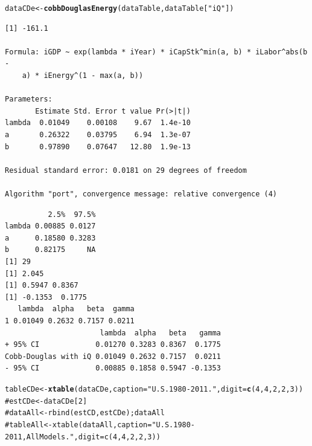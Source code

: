 \documentclass[preprint,authoryear,12pt]{elsarticle}\usepackage{graphicx, color}
\makeatletter
\newcommand{\hlfunctioncall}[1]{\textcolor[rgb]{0.501960784313725,0,0.329411764705882}{\textbf{#1}}}%
\newcommand{\hlstring}[1]{\textcolor[rgb]{0.6,0.6,1}{#1}}%
\newcommand{\hlcomment}[1]{\textcolor[rgb]{0.180392156862745,0.6,0.341176470588235}{#1}}%
\newenvironment{kframe}{%
 \def\at@end@of@kframe{}%
 \ifinner\ifhmode%
  \def\at@end@of@kframe{\end{minipage}}%
  \begin{minipage}{\columnwidth}%
 \fi\fi%
 \def\FrameCommand##1{\hskip\@totalleftmargin \hskip-\fboxsep
 \colorbox{shadecolor}{##1}\hskip-\fboxsep
     \hskip-\linewidth \hskip-\@totalleftmargin \hskip\columnwidth}%
 \MakeFramed {\advance\hsize-\width
   \@totalleftmargin\z@ \linewidth\hsize
   \@setminipage}}%
 {\par\unskip\endMakeFramed%
 \at@end@of@kframe}
\newenvironment{knitrout}{}{} %
\makeatother
\begin{document}
\begin{knitrout}
\color{fgcolor}\begin{kframe}
\begin{alltt}
dataCDe <- \hlfunctioncall{cobbDouglasEnergy}(dataTable, dataTable[\hlstring{"iQ"}])
\end{alltt}
\begin{verbatim}
[1] -161.1

Formula: iGDP ~ exp(lambda * iYear) * iCapStk^min(a, b) * iLabor^abs(b - 
    a) * iEnergy^(1 - max(a, b))

Parameters:
       Estimate Std. Error t value Pr(>|t|)
lambda  0.01049    0.00108    9.67  1.4e-10
a       0.26322    0.03795    6.94  1.3e-07
b       0.97890    0.07647   12.80  1.9e-13

Residual standard error: 0.0181 on 29 degrees of freedom

Algorithm "port", convergence message: relative convergence (4) 
\end{verbatim}


{\ttfamily\noindent\itshape\color{messagecolor}{Waiting for profiling to be done...}}\begin{verbatim}
          2.5%  97.5%
lambda 0.00885 0.0127
a      0.18580 0.3283
b      0.82175     NA
[1] 29
[1] 2.045
[1] 0.5947 0.8367
[1] -0.1353  0.1775
   lambda  alpha   beta  gamma
1 0.01049 0.2632 0.7157 0.0211
                      lambda  alpha   beta   gamma
+ 95% CI             0.01270 0.3283 0.8367  0.1775
Cobb-Douglas with iQ 0.01049 0.2632 0.7157  0.0211
- 95% CI             0.00885 0.1858 0.5947 -0.1353
\end{verbatim}
\begin{alltt}
tableCDe <- \hlfunctioncall{xtable}(dataCDe, caption=\hlstring{"U.S. 1980-2011."}, digit = \hlfunctioncall{c}(4, 4, 2, 2, 3))
\hlcomment{#estCDe <- dataCDe[2]}
\hlcomment{#dataAll <- rbind(estCD, estCDe); dataAll}
\hlcomment{#tableAll <- xtable(dataAll, caption="U.S. 1980-2011, All Models.", digit = c(4, 4, 2, 2, 3))}
\end{alltt}
\end{kframe}
\end{knitrout}
\end{document}
